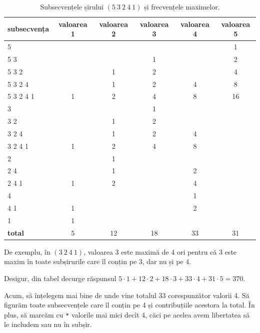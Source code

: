 \begin{table}[H]
  \centering
  \begin{tabular}{lccccc}
    \textbf{subsecvența} & \textbf{valoarea 1} & \textbf{valoarea 2} & \textbf{valoarea 3} & \textbf{valoarea 4} & \textbf{valoarea 5}\\
    \hline
    5              &   &    &    &    &  1 \\
    5 3            &   &    &  1 &    &  2 \\
    5 3 2          &   &  1 &  2 &    &  4 \\
    5 3 2 4        &   &  1 &  2 &  4 &  8 \\
    5 3 2 4 1      & 1 &  2 &  4 &  8 & 16 \\
    3              &   &    &  1 &    &    \\
    3 2            &   &  1 &  2 &    &    \\
    3 2 4          &   &  1 &  2 &  4 &    \\
    3 2 4 1        & 1 &  2 &  4 &  8 &    \\
    2              &   &  1 &    &    &    \\
    2 4            &   &  1 &    &  2 &    \\
    2 4 1          & 1 &  2 &    &  4 &    \\
    4              &   &    &    &  1 &    \\
    4 1            & 1 &    &    &  2 &    \\
    1              & 1 &    &    &    &    \\
    \hline
    \textbf{total} & 5 & 12 & 18 & 33 & 31 \\
  \end{tabular}

  \caption{Subsecvențele șirului $(5\ 3\ 2\ 4\ 1)$ și frecvențele maximelor.}
\end{table}

De exemplu, în $(3\ 2\ 4\ 1)$, valoarea 3 este maximă de 4 ori pentru că 3 este maxim în toate subșirurile care îl conțin pe 3, dar nu și pe 4.

Desigur, din tabel decurge răspunsul $5 \cdot 1 + 12 \cdot 2 + 18 \cdot 3 + 33 \cdot 4 + 31 \cdot 5 = 370$.

Acum, să înțelegem mai bine de unde vine totalul 33 corespunzător valorii 4. Să figurăm toate subsecvențele care îl conțin pe 4 și contribuțiile acestora la total. În plus, să marcăm cu \texttt{*} valorile mai mici decît 4, căci pe acelea avem libertatea să le includem sau nu în subșir.

